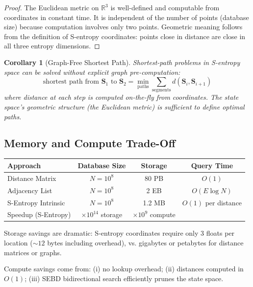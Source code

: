 \documentclass[twocolumn,11pt,a4paper]{article}
\newtheorem{corollary}[theorem]{Corollary}
\newcommand{\Stuple}{\mathbf{S}}
\begin{document}
\begin{proof}
The Euclidean metric on $\mathbb{R}^3$ is well-defined and computable from coordinates in constant time. It is independent of the number of points (database size) because computation involves only two points. Geometric meaning follows from the definition of S-entropy coordinates: points close in distance are close in all three entropy dimensions.
\end{proof}

\begin{corollary}[Graph-Free Shortest Path]
\label{cor:graph_free}
Shortest-path problems in S-entropy space can be solved without explicit graph pre-computation:
\begin{equation}
\text{shortest path from } \Stuple_1 \text{ to } \Stuple_2 = \min_{\text{paths}} \sum_{\text{segments}} d(\Stuple_i, \Stuple_{i+1})
\end{equation}
where distance at each step is computed on-the-fly from coordinates. The state space's geometric structure (the Euclidean metric) is sufficient to define optimal paths.
\end{corollary}

\subsection{Memory and Compute Trade-Off}

\begin{table}[H]
\centering
\begin{tabular}{lccc}
\toprule
Approach & Database Size & Storage & Query Time \\
\midrule
Distance Matrix & $N=10^8$ & 80 PB & $O(1)$ \\
Adjacency List & $N=10^8$ & 2 EB & $O(E \log N)$ \\
S-Entropy Intrinsic & $N=10^8$ & 1.2 MB & $O(1)$ per distance \\
\midrule
Speedup (S-Entropy) & $\times 10^{14}$ storage & $\times 10^9$ compute \\
\bottomrule
\end{tabular}
\end{table}

Storage savings are dramatic: S-entropy coordinates require only 3 floats per location ($\sim 12$ bytes including overhead), vs. gigabytes or petabytes for distance matrices or graphs.

Compute savings come from: (i) no lookup overhead; (ii) distances computed in $O(1)$; (iii) SEBD bidirectional search efficiently prunes the state space.
\end{document}
